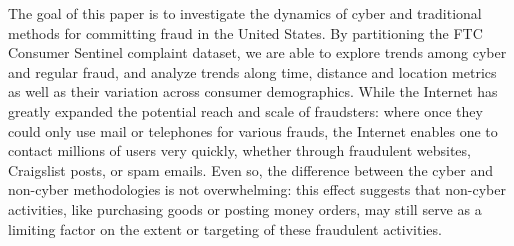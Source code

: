 \documentclass[conference]{IEEEtran}
\begin{document}
The goal of this paper is to investigate the dynamics of cyber and traditional methods for committing  fraud in the United States. By partitioning the FTC Consumer Sentinel complaint dataset, we are able to explore trends among cyber and regular fraud, and analyze trends along time, distance and location metrics as well as their variation across consumer demographics. While the Internet has greatly expanded the potential reach and scale of fraudsters: where once they could only use mail or telephones for various frauds, the Internet enables one to contact millions of users very quickly, whether through fraudulent websites, Craigslist posts, or spam emails. Even so, the difference between the cyber and non-cyber methodologies is not overwhelming: this effect suggests that non-cyber activities, like purchasing goods or posting money orders, may still serve as a limiting factor on the extent or targeting of these fraudulent activities.





 




\end{document}
